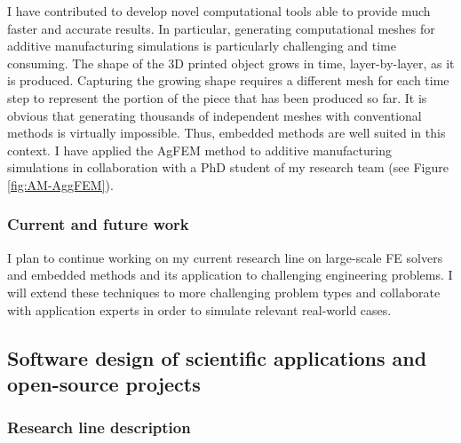 \documentclass{article}
\begin{document}
I have contributed to develop novel computational tools able to provide much faster and accurate results. In particular, generating computational meshes for additive manufacturing simulations is particularly challenging and time consuming. The shape of the 3D printed object grows in time, layer-by-layer, as it is produced. Capturing the growing shape requires a different mesh for each time step to represent the portion of the piece that has been produced so far. It is obvious that generating thousands of independent meshes with conventional methods is virtually impossible.  Thus, embedded methods are well suited in this context. {{I have applied the AgFEM method to additive manufacturing simulations}} in collaboration with a PhD student of my research team (see Figure \ref{fig:AM-AggFEM}). %

\subsubsection{Current and future work}

 I plan to continue working on my current research line on large-scale FE solvers and embedded  methods and its application to challenging engineering problems. I will extend these techniques to more challenging problem types and collaborate with application experts in order to simulate relevant real-world cases.
 
 
\subsection{Software design of scientific applications and open-source projects}

\subsubsection{Research line description}
\end{document}

